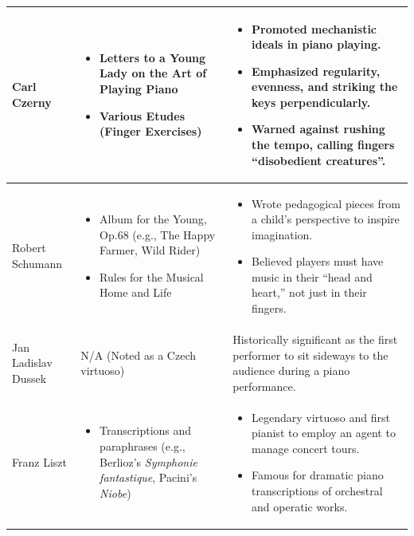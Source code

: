 \documentclass[math,code]{amznotes}
\theoremstyle{remark}
\begin{document}
\begin{longtable}{|p{3cm}|p{6cm}|p{7cm}|}
Carl Czerny &
\begin{itemize}[leftmargin=*]
\item Letters to a Young Lady on the Art of Playing Piano
\item Various Etudes (Finger Exercises)
\end{itemize}
&
\begin{itemize}[leftmargin=*]
\item Promoted mechanistic ideals in piano playing.
\item Emphasized regularity, evenness, and striking the keys perpendicularly.
\item Warned against rushing the tempo, calling fingers ``disobedient creatures''.
\end{itemize}
\\
\hline


Robert Schumann &
\begin{itemize}[leftmargin=*]
\item Album for the Young, Op.68 (e.g., The Happy Farmer, Wild Rider)
\item Rules for the Musical Home and Life
\end{itemize}
&
\begin{itemize}[leftmargin=*]
\item Wrote pedagogical pieces from a child's perspective to inspire imagination.
\item Believed players must have music in their ``head and heart,'' not just in their fingers.
\end{itemize}
\\
\hline


Jan Ladislav Dussek &
N/A (Noted as a Czech virtuoso)
&
Historically significant as the first performer to sit sideways to the audience during a piano performance.
\\
\hline


Franz Liszt &
\begin{itemize}[leftmargin=*]
\item Transcriptions and paraphrases (e.g., Berlioz's \textit{Symphonie fantastique}, Pacini's \textit{Niobe})
\end{itemize}
&
\begin{itemize}[leftmargin=*]
\item Legendary virtuoso and first pianist to employ an agent to manage concert tours.
\item Famous for dramatic piano transcriptions of orchestral and operatic works.
\end{itemize}
\\
\hline



\end{longtable}
\end{document}
